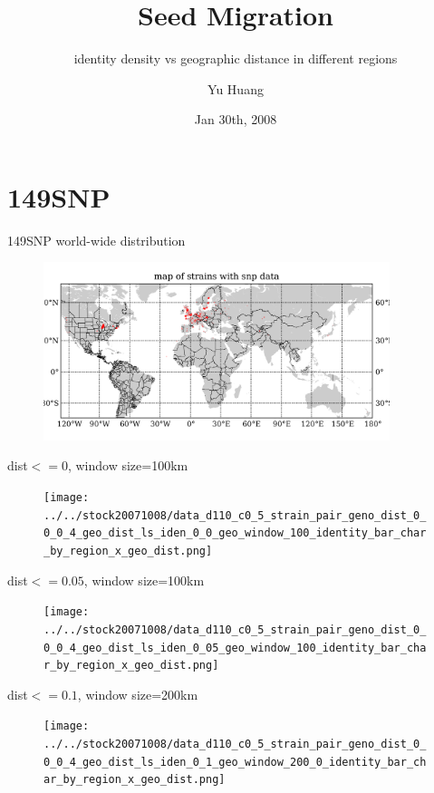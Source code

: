 \documentclass{beamer}
\title{Seed Migration}
\subtitle{identity density vs geographic distance in different regions}
\author{Yu Huang}
\institute{MCB USC}
\date{Jan 30th, 2008}
\begin{document}
{
\begin{beamercolorbox}{}
     \vskip3pt \insertcaption \vskip3pt
  \end{beamercolorbox}
}

\frame{\titlepage}

\section{149SNP}

\begin{frame}{149SNP world-wide distribution}
\begin{figure}
  \includegraphics[width=0.9\textwidth]{../lab_meeting_2007_10_23/data_d110_c0_5_strain_map_with_data.png}
\end{figure}
\end{frame}

\begin{frame}{dist$<=0$, window size=100km}
\begin{figure}
  \texttt{[image: ../../stock20071008/data\_d110\_c0\_5\_strain\_pair\_geno\_dist\_0\_0\_0\_4\_geo\_dist\_ls\_iden\_0\_0\_geo\_window\_100\_identity\_bar\_char\_by\_region\_x\_geo\_dist.png]}
\end{figure}
\end{frame}

\begin{frame}{dist$<=0.05$, window size=100km}
\begin{figure}
  \texttt{[image: ../../stock20071008/data\_d110\_c0\_5\_strain\_pair\_geno\_dist\_0\_0\_0\_4\_geo\_dist\_ls\_iden\_0\_05\_geo\_window\_100\_identity\_bar\_char\_by\_region\_x\_geo\_dist.png]}
\end{figure}
\end{frame}

\begin{frame}{dist$<=0.1$, window size=200km}
\begin{figure}
  \texttt{[image: ../../stock20071008/data\_d110\_c0\_5\_strain\_pair\_geno\_dist\_0\_0\_0\_4\_geo\_dist\_ls\_iden\_0\_1\_geo\_window\_200\_0\_identity\_bar\_char\_by\_region\_x\_geo\_dist.png]}
\end{figure}
\end{frame}
\end{document}
